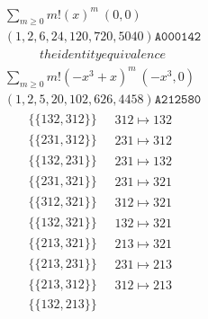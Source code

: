 \allowdisplaybreaks
\begin{scriptsize}
$$
\begin{matrix}
\sum_{m \geq 0} m! \left(
x
\right)^m
\ 
\left(0, 0\right)
\\
\left(1, 2, 6, 24, 120, 720, 5040\right)
\texttt{A000142}
\end{matrix}
$$
\begin{align}
the identity equivalence
\end{align}
$$
\begin{matrix}
\sum_{m \geq 0} m! \left(
-x^{3} + x
\right)^m
\ 
\left(-x^{3}, 0\right)
\\
\left(1, 2, 5, 20, 102, 626, 4458\right)
\texttt{A212580}
\end{matrix}
$$
\begin{align}
\{\{132, 312\}\}
\ 
&
\begin{matrix}
312 \mapsto 132
\end{matrix}
\\
\{\{231, 312\}\}
\ 
&
\begin{matrix}
231 \mapsto 312
\end{matrix}
\\
\{\{132, 231\}\}
\ 
&
\begin{matrix}
231 \mapsto 132
\end{matrix}
\\
\{\{231, 321\}\}
\ 
&
\begin{matrix}
231 \mapsto 321
\end{matrix}
\\
\{\{312, 321\}\}
\ 
&
\begin{matrix}
312 \mapsto 321
\end{matrix}
\\
\{\{132, 321\}\}
\ 
&
\begin{matrix}
132 \mapsto 321
\end{matrix}
\\
\{\{213, 321\}\}
\ 
&
\begin{matrix}
213 \mapsto 321
\end{matrix}
\\
\{\{213, 231\}\}
\ 
&
\begin{matrix}
231 \mapsto 213
\end{matrix}
\\
\{\{213, 312\}\}
\ 
&
\begin{matrix}
312 \mapsto 213
\end{matrix}
\\
\{\{132, 213\}\}
\ 
&
\begin{matrix}

\end{matrix}
\end{align}
\end{scriptsize}
